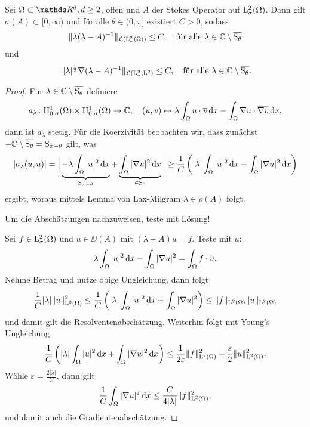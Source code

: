 \begin{prop}
  Sei $\Omega \subset \R^d, d\geq2$, offen und $A$ der Stokes Operator auf $\mathrm{L}^2_\sigma(\Omega)$. Dann gilt $\sigma(A) \subset [0,\infty)$ und für alle $\theta \in (0,\pi]$ existiert $C > 0$, sodass
  $$
  \| \lambda (\lambda - A)^{-1}\|_{\mathcal{L}(\mathrm{L}^2_\sigma(\Omega))} \leq C, \quad\text{für alle } \lambda \in \mathbb{C} \setminus \overline{\mathrm{S}_\theta}
  $$
  und
  $$
  \| |\lambda|^{\frac{1}{2}} \nabla (\lambda - A)^{-1} \|_{\mathcal{L}(\mathrm{L}_\sigma^2, \mathrm{L}^2)} \leq C, \quad\text{für alle } \lambda \in \mathbb{C} \setminus \overline{\mathrm{S}_\theta}.
  $$
\end{prop}

\begin{proof}
  Für $\lambda \in \mathbb{C} \setminus \overline{\mathrm{S}_\theta}$ definiere
  $$
  a_\lambda \colon \mathrm{H}_{0,\sigma}^1(\Omega) \times \mathrm{H}_{0,\sigma}^1(\Omega) \to \mathbb{C}, \quad (u,v) \mapsto \lambda \int_\Omega u \cdot \overline v \, {\operatorname{d}\!{x}} - \int_\Omega \nabla u \cdot \overline{\nabla v} \, {\operatorname{d}\!{x}},
  $$
  dann ist $a_\lambda$ stetig.
  Für die Koerzivität beobachten wir, dass zunächst $- \mathbb{C} \setminus \overline{\mathrm{S}_\theta} = \mathrm{S}_{\pi - \theta}$ gilt, was
  $$
  |a_\lambda(u,u)| 
  = \Big| \underbrace{- \lambda\int_\Omega |u|^2 \, {\operatorname{d}\!{x}}}_{\mathrm{S}_{\pi - \theta}} + \underbrace{\int_\Omega |\nabla u|^2 \, {\operatorname{d}\!{x}}}_{\in \mathrm{S}_0} \Big| 
  \geq \frac{1}{C} \left( |\lambda| \int_\Omega |u|^2 \, {\operatorname{d}\!{x}} + \int_\Omega |\nabla u|^2 \, {\operatorname{d}\!{x}}\right)
  $$
  ergibt, woraus mittels Lemma von Lax-Milgram $\lambda \in \rho(A)$ folgt.
  
  Um die Abschätzungen nachzuweisen, teste mit Lösung!

  Sei $f \in \mathrm{L}_\sigma^2(\Omega)$ und $u \in \DD(A)$ mit $(\lambda - A) u = f$.
  Teste mit $u$:
  $$
  \lambda \int_\Omega |u|^2 \, {\operatorname{d}\!{x}} - \int_\Omega |\nabla u|^2 = \int_\Omega f \cdot \overline u.
  $$
  Nehme Betrag und nutze obige Ungleichung, dann folgt
  $$
  \frac{1}{C} |\lambda|\|u\|_{\mathrm{L}^2(\Omega)}^2 
  \leq \frac{1}{C} \left(|\lambda| \int_\Omega |u|^2 \, {\operatorname{d}\!{x}} + \int_\Omega |\nabla u|^2\right) 
  \leq \|f\|_{\mathrm{L}^2(\Omega)} \|u\|_{\mathrm{L}^2(\Omega)}
  $$
  und damit gilt die Resolventenabschätzung.
  Weiterhin folgt mit Young's Ungleichung
  $$
  \frac{1}{C} \left(|\lambda| \int_\Omega |u|^2 \, {\operatorname{d}\!{x}} + \int_\Omega |\nabla u|^2 \, {\operatorname{d}\!{x}} \right)
  \leq \frac{1}{2\varepsilon} \|f\|_{\mathrm{L}^2(\Omega)}^2 + \frac{\varepsilon}{2} \|u\|_{\mathrm{L}^2(\Omega)}^2.
  $$
  Wähle $\varepsilon = \frac{2| \lambda|}{C}$, dann gilt
  $$
  \frac{1}{C} \int_\Omega |\nabla u|^2 \, {\operatorname{d}\!{x}} \leq \frac{C}{4|\lambda|} \|f \|_{\mathrm{L}^2(\Omega)}^2,
  $$
  und damit auch die Gradientenabschätzung.
\end{proof}

